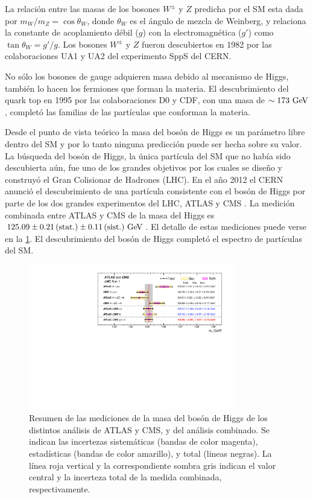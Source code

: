 La relación entre las masas de los bosones $W^\pm$ y $Z$ predicha por el SM esta
dada por $m_W/m_Z = \cos \theta_W$, donde $\theta_W$ es el ángulo de
mezcla de Weinberg, y relaciona la constante de acoplamiento débil ($g$) con la
electromagnética ($g'$) como $\tan\theta_W = g'/g$. Los bosones $W^\pm$ y $Z$
fueron descubiertos en 1982 por las colaboraciones UA1 y UA2 del experimento
SppS del CERN.

No sólo los bosones de gauge adquieren masa debido al mecanismo de Higgs,
también lo hacen los fermiones que forman la materia. El descubrimiento del
quark top en 1995 por las colaboraciones D0 y CDF, con una masa de $\sim 173
\GeV$, completó las familias de las partículas que conforman la materia.

Desde el punto de vista teórico la masa del bosón de Higgs es un parámetro libre
dentro del SM y por lo tanto ninguna predicción puede ser hecha sobre su valor. La búsqueda
del bosón de Higgs, la única partícula del SM que no había sido descubierta
aún, fue uno de los grandes objetivos por los cuales se dise\~no y construyó el
Gran Colisionar de Hadrones (LHC). En el a\~no 2012 el CERN anunció el
descubrimiento de una partícula consistente con el bosón de Higgs por parte de
los dos grandes experimentos del LHC, ATLAS y CMS
\cite{Aad:2012tfa,Chatrchyan:2012ufa}. La medición combinada entre ATLAS y CMS
de la masa del Higgs es $125.09 \pm 0.21\, \text{(stat.)} \pm 0.11\, \text{(sist.)}
\gev$\cite{HiggsMass_ATLAS_CMS}. %
El detalle de estas mediciones  puede verse en la \cref{fig:higgs_cms_atlas}.
El descubrimiento del bosón de Higgs completó el espectro de partículas del SM.

\begin{figure}[!htbp]
  \centering
  \includegraphics[width=0.8\textwidth]{figures/higgs_atlas_cms_mass}
  \caption{Resumen de las mediciones de la masa del bosón de Higgs de los
    distintos análisis de ATLAS y CMS, y del análisis combinado. Se indican las
    incertezas sistemáticas (bandas de color magenta), estadísticas (bandas de
    color amarillo), y total (lineas negras). La línea roja vertical y la
    correspondiente sombra gris indican el valor central y la incerteza total de
    la medida combinada, respectivamente\cite{HiggsMass_ATLAS_CMS}.}
  \label{fig:higgs_cms_atlas}
\end{figure}



